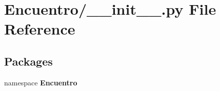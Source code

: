 \section{\-Encuentro/\-\_\-\-\_\-init\-\_\-\-\_\-.py \-File \-Reference}
\label{_encuentro_2____init_____8py}
\subsection*{\-Packages}
\begin{DoxyCompactItemize}
\item 
namespace {\bf \-Encuentro}
\end{DoxyCompactItemize}
